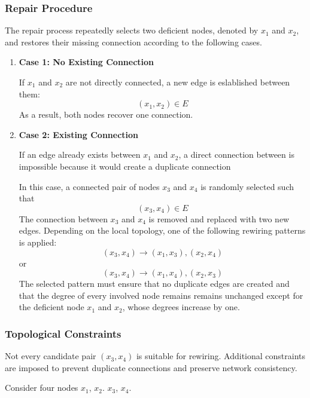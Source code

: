 \subsubsection{\textbf{Repair Procedure}}
\label{subsubsec:repair_procedure}
The repair process repeatedly selects two deficient nodes, denoted by $x_1$ and $x_2$, and restores their
missing connection according to the following cases.

\begin{enumerate}
  \item \textbf{Case 1: No Existing Connection}

        If $x_1$ and $x_2$ are not directly connected, a new edge is eslablished between them: $$(x_1, x_2) \in E$$ As a
        result, both nodes recover one connection.

  \item \textbf{Case 2: Existing Connection}

        If an edge already exists between $x_1$ and $x_2$, a direct connection between is impossible because it would create a
        duplicate connection

        In this case, a connected pair of nodes $x_3$ and $x_4$ is randomly selected such that $$(x_3, x_4) \in E$$ The
        connection between $x_3$ and $x_4$ is removed and replaced with two new edges. Depending on the local topology, one of
        the following rewiring patterns is applied: $$(x_3, x_4) \rightarrow (x_1, x_3), (x_2, x_4)$$ or $$(x_3, x_4)
          \rightarrow (x_1, x_4), (x_2, x_3)$$ The selected pattern must ensure that no duplicate edges are created and that the
        degree of every involved node remains remains unchanged except for the deficient node $x_1$ and $x_2$, whose degrees
        increase by one.

\end{enumerate}

\subsubsection{\textbf{Topological Constraints}}
\label{subsubsec:topological_constraints}
Not every candidate pair $(x_3, x_4)$ is suitable for rewiring. Additional constraints are imposed to prevent
duplicate connections and preserve network consistency.

Consider four nodes $x_1$, $x_2$. $x_3$, $x_4$.

